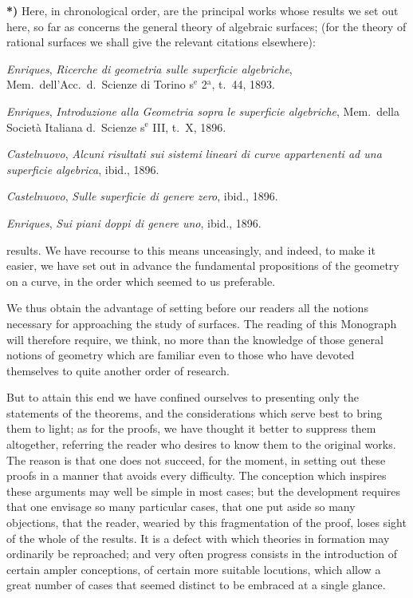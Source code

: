 \documentclass{article}
\begin{document}
\textbf{*)} Here, in chronological order, are the principal works whose results we set out here, so far as concerns the general theory of algebraic surfaces; (for the theory of rational surfaces we shall give the relevant citations elsewhere):

\emph{Enriques}, \emph{Ricerche di geometria sulle superficie algebriche}, Mem.\ dell'Acc.\ d.\ Scienze di Torino s${}^{\text{e}}$ 2${}^{\text{a}}$, t.\ 44, 1893.

\emph{Enriques}, \emph{Introduzione alla Geometria sopra le superficie algebriche}, Mem.\ della Società Italiana d.\ Scienze s${}^{\text{e}}$ III, t.\ X, 1896.

\emph{Castelnuovo}, \emph{Alcuni risultati sui sistemi lineari di curve appartenenti ad una superficie algebrica}, ibid., 1896.

\emph{Castelnuovo}, \emph{Sulle superficie di genere zero}, ibid., 1896.

\emph{Enriques}, \emph{Sui piani doppi di genere uno}, ibid., 1896.

results. We have recourse to this means unceasingly, and indeed, to make it easier, we have set out in advance the fundamental propositions of the geometry on a curve, in the order which seemed to us preferable.

We thus obtain the advantage of setting before our readers all the notions necessary for approaching the study of surfaces. The reading of this Monograph will therefore require, we think, no more than the knowledge of those general notions of geometry which are familiar even to those who have devoted themselves to quite another order of research.

But to attain this end we have confined ourselves to presenting only the statements of the theorems, and the considerations which serve best to bring them to light; as for the proofs, we have thought it better to suppress them altogether, referring the reader who desires to know them to the original works. The reason is that one does not succeed, for the moment, in setting out these proofs in a manner that avoids every difficulty. The conception which inspires these arguments may well be simple in most cases; but the development requires that one envisage so many particular cases, that one put aside so many objections, that the reader, wearied by this fragmentation of the proof, loses sight of the whole of the results. It is a defect with which theories in formation may ordinarily be reproached; and very often progress consists in the introduction of certain ampler conceptions, of certain more suitable locutions, which allow a great number of cases that seemed distinct to be embraced at a single glance.
\end{document}
